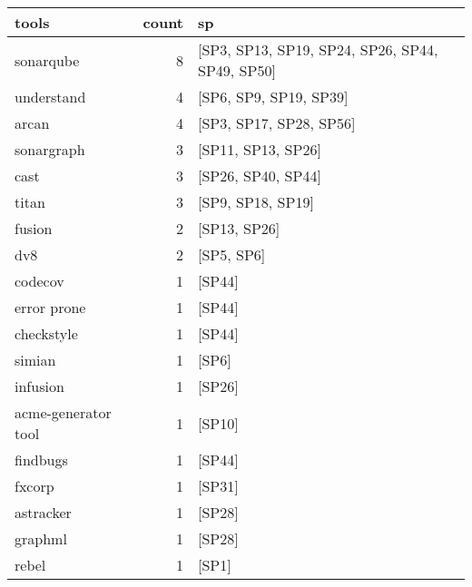 \begin{tabular}{lrl}
\toprule
               tools &  count &                                                     sp \\
\midrule
           sonarqube &      8 &        [SP3, SP13, SP19, SP24, SP26, SP44, SP49, SP50] \\
          understand &      4 &                                 [SP6, SP9, SP19, SP39] \\
               arcan &      4 &                                [SP3, SP17, SP28, SP56] \\
          sonargraph &      3 &                                     [SP11, SP13, SP26] \\
                cast &      3 &                                     [SP26, SP40, SP44] \\
               titan &      3 &                                      [SP9, SP18, SP19] \\
              fusion &      2 &                                           [SP13, SP26] \\
                 dv8 &      2 &                                             [SP5, SP6] \\
             codecov &      1 &                                                 [SP44] \\
         error prone &      1 &                                                 [SP44] \\
          checkstyle &      1 &                                                 [SP44] \\
              simian &      1 &                                                  [SP6] \\
            infusion &      1 &                                                 [SP26] \\
 acme-generator tool &      1 &                                                 [SP10] \\
            findbugs &      1 &                                                 [SP44] \\
              fxcorp &      1 &                                                 [SP31] \\
           astracker &      1 &                                                 [SP28] \\
             graphml &      1 &                                                 [SP28] \\
               rebel &      1 &                                                  [SP1] \\

\end{tabular}
